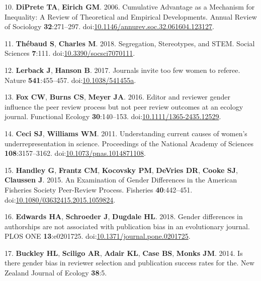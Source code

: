 \documentclass[11pt,]{article}
\begin{document}
\hypertarget{ref-diprete_cumulative_2006}{}
10. \textbf{DiPrete TA}, \textbf{Eirich GM}. 2006. Cumulative Advantage
as a Mechanism for Inequality: A Review of Theoretical and Empirical
Developments. Annual Review of Sociology \textbf{32}:271--297.
doi:\href{https://doi.org/10.1146/annurev.soc.32.061604.123127}{10.1146/annurev.soc.32.061604.123127}.

\hypertarget{ref-thebaud_segregation_2018}{}
11. \textbf{Thébaud S}, \textbf{Charles M}. 2018. Segregation,
Stereotypes, and STEM. Social Sciences \textbf{7}:111.
doi:\href{https://doi.org/10.3390/socsci7070111}{10.3390/socsci7070111}.

\hypertarget{ref-lerback_journals_2017}{}
12. \textbf{Lerback J}, \textbf{Hanson B}. 2017. Journals invite too few
women to referee. Nature \textbf{541}:455--457.
doi:\href{https://doi.org/10.1038/541455a}{10.1038/541455a}.

\hypertarget{ref-fox_editor_2016}{}
13. \textbf{Fox CW}, \textbf{Burns CS}, \textbf{Meyer JA}. 2016. Editor
and reviewer gender influence the peer review process but not peer
review outcomes at an ecology journal. Functional Ecology
\textbf{30}:140--153.
doi:\href{https://doi.org/10.1111/1365-2435.12529}{10.1111/1365-2435.12529}.

\hypertarget{ref-ceci_understanding_2011}{}
14. \textbf{Ceci SJ}, \textbf{Williams WM}. 2011. Understanding current
causes of women's underrepresentation in science. Proceedings of the
National Academy of Sciences \textbf{108}:3157--3162.
doi:\href{https://doi.org/10.1073/pnas.1014871108}{10.1073/pnas.1014871108}.

\hypertarget{ref-handley_examination_2015}{}
15. \textbf{Handley G}, \textbf{Frantz CM}, \textbf{Kocovsky PM},
\textbf{DeVries DR}, \textbf{Cooke SJ}, \textbf{Claussen J}. 2015. An
Examination of Gender Differences in the American Fisheries Society
Peer-Review Process. Fisheries \textbf{40}:442--451.
doi:\href{https://doi.org/10.1080/03632415.2015.1059824}{10.1080/03632415.2015.1059824}.

\hypertarget{ref-edwards_gender_2018}{}
16. \textbf{Edwards HA}, \textbf{Schroeder J}, \textbf{Dugdale HL}.
2018. Gender differences in authorships are not associated with
publication bias in an evolutionary journal. PLOS ONE
\textbf{13}:e0201725.
doi:\href{https://doi.org/10.1371/journal.pone.0201725}{10.1371/journal.pone.0201725}.

\hypertarget{ref-buckley_is_2014}{}
17. \textbf{Buckley HL}, \textbf{Sciligo AR}, \textbf{Adair KL},
\textbf{Case BS}, \textbf{Monks JM}. 2014. Is there gender bias in
reviewer selection and publication success rates for the. New Zealand
Journal of Ecology \textbf{38}:5.
\end{document}
